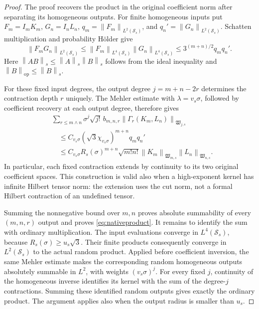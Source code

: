 \documentclass[11pt,a4paper]{amsart}
\numberwithin{equation}{section}
\theoremstyle{definition}
\theoremstyle{remark}
\newcommand{\Sch}{\mathcal S}
\newcommand{\Wc}{\mathfrak W}
\newcommand{\op}{\mathrm{op}}
\newcommand{\norm}[1]{\left\lVert#1\right\rVert}
\begin{document}
\begin{proof}
The proof recovers the product in the original coefficient norm after separating its homogeneous outputs. For finite homogeneous inputs put
$F_m=I_mK_m$, $G_n=I_nL_n$, $q_m=\norm{F_m}_{L^2(\Sch_s)}$, and $q_n'=\norm{G_n}_{L^2(\Sch_s)}$. Schatten multiplication and probability H\"older give
\[
 \norm{F_mG_n}_{L^2(\Sch_s)}
 \le\norm{F_m}_{L^4(\Sch_s)}\norm{G_n}_{L^4(\Sch_s)}
 \le3^{(m+n)/2}q_mq_n'.
\]
Here $\norm{AB}_s\le\norm A_s\norm B_s$ follows from the ideal inequality and $\norm B_{\op}\le\norm B_s$.

For these fixed input degrees, the output degree $j=m+n-2r$ determines the contraction depth $r$ uniquely. The Mehler estimate with $\lambda=v_s\sigma$, followed by coefficient recovery at each output degree, therefore gives
\begin{equation}\label{eq:nativeabsolute}
 \begin{split}
 &\sum_{r\le m\wedge n}\sigma^j\sqrt{j!}\,b_{m,n,r}
       \norm{\Gamma_r(K_m,L_n)}_{\Wc_{j,s}}\\
 &\quad\le C_{v_s\sigma}(\sqrt3\chi_{v_s\sigma})^{m+n}q_mq_n'\\
 &\quad\le C_{v_s\sigma}R_s(\sigma)^{m+n}\sqrt{m!n!}
       \norm{K_m}_{\Wc_{m,s}}\norm{L_n}_{\Wc_{n,s}}.
 \end{split}
\end{equation}
In particular, each fixed contraction extends by continuity to its two original coefficient spaces. This construction is valid also when a high-exponent kernel has infinite Hilbert tensor norm: the extension uses the cut norm, not a formal Hilbert contraction of an undefined tensor.

Summing the nonnegative bound over $m,n$ proves absolute summability of every $(m,n,r)$ output and proves \eqref{eq:nativeproduct}. It remains to identify the sum with ordinary multiplication. The input evaluations converge in $L^4(\Sch_s)$, because $R_s(\sigma)\ge u_s\sqrt3$. Their finite products consequently converge in $L^2(\Sch_s)$ to the actual random product. Applied before coefficient inversion, the same Mehler estimate makes the corresponding random homogeneous outputs absolutely summable in $L^2$, with weights $(v_s\sigma)^j$. For every fixed $j$, continuity of the homogeneous inverse identifies its kernel with the sum of the degree-$j$ contractions. Summing these identified random outputs gives exactly the ordinary product. The argument applies also when the output radius is smaller than $u_s$.


\end{proof}
\end{document}
